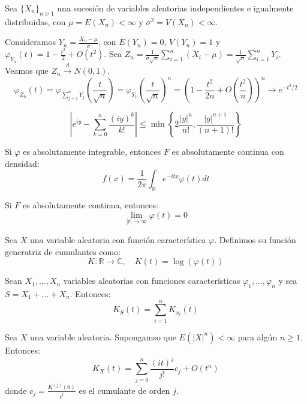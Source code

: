 \begin{remark}
    Sea $\{X_n\}_{n \geq 1}$ una sucesión de variables aleatorias independientes e igualmente distribuidas, con $\mu = E(X_n) < \infty$ y $\sigma^2 = V(X_n) < \infty$.

    Consideramos $Y_n = \frac{X_n - \mu}{\sigma}$, con $E(Y_n) = 0$, $V(Y_n) = 1$ y $\varphi_{Y_n}(t) = 1 - \frac{t^2}{2} + O(t^2)$.
    Sea $Z_n = \frac{1}{\sigma\sqrt{n}} \sum_{i=1}^n (X_i - \mu) = \frac{1}{\sqrt{n}} \sum_{i=1}^n Y_i$. Veamos que $Z_n \xrightarrow{d} N(0, 1)$.
    $$\varphi_{Z_n}(t) = \varphi_{\sum_{j=1}^n Y_j} \left(\frac{t}{\sqrt{n}}\right) = \varphi_{Y_1} \left(\frac{t}{\sqrt{n}}\right)^n = \left(1 - \frac{t^2}{2n} + O\left(\frac{t^2}{n}\right)\right)^n \to e^{-t^2/2}$$
\end{remark}

\begin{lemma}
    $$\left|e^{iy} - \sum_{k=0}^n \frac{(iy)^k}{k!}\right| \leq \min\left\{2\frac{|y|^n}{n!}, \frac{|y|^{n+1}}{(n+1)!}\right\}$$
\end{lemma}

\begin{theorem}
    Si $\varphi$ es absolutamente integrable, entonces $F$ es absolutamente continua con densidad:
    $$f(x) = \frac{1}{2\pi} \int_\mathbb{R} e^{-itx}\varphi(t)dt$$
\end{theorem}

\begin{theorem}
    Si $F$ es absolutamente continua, entonces:
    $$\lim\limits_{|t| \to \infty} \varphi(t) = 0$$
\end{theorem}

\begin{definition}
    Sea $X$ una variable aleatoria con función característica $\varphi$.
    Definimos su función generatriz de cumulantes como:
    $$K: \mathbb{R} \to \mathbb{C}, \quad K(t) = \log(\varphi(t))$$
\end{definition}

\begin{proposition}
    Sean $X_1, \dots, X_n$ variables aleatorias con funciones características $\varphi_1, \dots, \varphi_n$ y sea $S = X_1 + \dots + X_n$.
    Entonces:
    $$K_S(t) = \sum_{i=1}^n K_{x_i}(t)$$
\end{proposition}

\begin{theorem}
    Sea $X$ una variable aleatoria.
    Supongamso que $E(|X|^n) < \infty$ para algún $n \geq 1$.
    Entonces:
    $$K_X(t) = \sum_{j=0}^n \frac{(it)^j}{j!}c_j + O(t^n)$$
    donde $c_j = \frac{K^{(j)}(0)}{i^j}$ es el cumulante de orden $j$.
\end{theorem}

